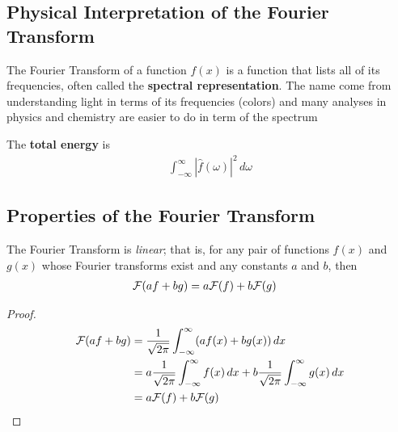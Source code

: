 \subsection{Physical Interpretation of the Fourier Transform}

The Fourier Transform of a function $f(x)$ is a function that lists all of its frequencies, often called the \textbf{spectral representation}.  The name come from understanding light in terms of its frequencies (colors) and many analyses in physics and chemistry are easier to do in term of the spectrum 

\begin{definition}
The \textbf{total energy} is 
%
\begin{align*}
\int_{-\infty}^{\infty} | \hat{f}(\omega)|^2 \, d\omega
\end{align*}
\end{definition}


\subsection{Properties of the Fourier Transform}

\begin{theorem}[Linearity]
The Fourier Transform is \emph{linear}; that is, for any pair of functions $f(x)$ and $g(x)$ whose Fourier transforms exist and any constants $a$ and $b$, then
%
\begin{align*}
{\cal F}(af+bg) &  = a {\cal F}(f) + b {\cal F}(g)  
\end{align*}
\end{theorem}

\begin{proof}
\begin{align*}
{\cal F}(af+bg) & = \frac{1}{\sqrt{2\pi}} \int_{-\infty}^{\infty} (a f(x) + b g(x)) \, dx \\
& = a \frac{1}{\sqrt{2\pi}} \int_{-\infty}^{\infty} f(x) \, dx + b \frac{1}{\sqrt{2\pi}} \int_{-\infty}^{\infty} g(x) \, dx \\
& = a {\cal F}(f) + b {\cal F}(g) 
\end{align*}
\end{proof}


